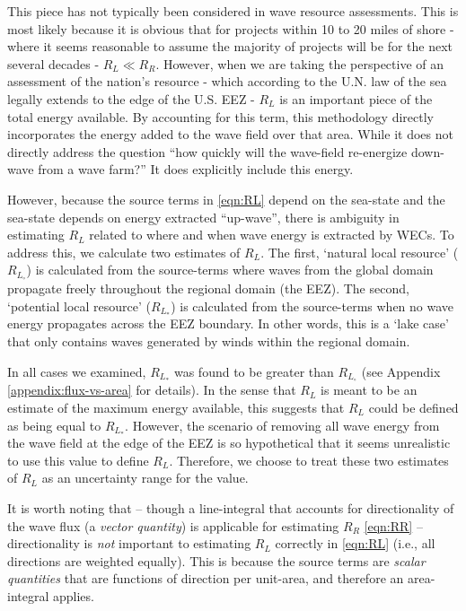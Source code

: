 This piece has not typically been considered in wave resource assessments. This is most likely because it is obvious that for projects within 10 to 20 miles of shore - where it seems reasonable to assume the majority of projects will be for the next several decades - $R_L \ll R_R$. However, when we are taking the perspective of an assessment of the nation's resource - which according to the U.N. law of the sea legally extends to the edge of the U.S. EEZ - $R_L$ is an important piece of the total energy available. By accounting for this term, this methodology directly incorporates the energy added to the wave field over that area. While it does not directly address the question ``how quickly will the wave-field re-energize down-wave from a wave farm?'' It does explicitly include this energy. 

However, because the source terms in \eqref{eqn:RL} depend on the sea-state and the sea-state depends on energy extracted ``up-wave'', there is ambiguity in estimating $R_L$ related to where and when wave energy is extracted by WECs. To address this, we calculate two estimates of $R_L$. The first, `natural local resource' ($R_{L_\circ}$) is calculated from the source-terms where waves from the global domain propagate freely throughout the regional domain (the EEZ). The second, `potential local resource' ($R_{L_*}$) is calculated from the source-terms when no wave energy propagates across the EEZ boundary. In other words, this is a `lake case' that only contains waves generated by winds within the regional domain.

In all cases we examined, $R_{L_*}$ was found to be greater than $R_{L_\circ}$ (see Appendix \ref{appendix:flux-vs-area} for details). In the sense that $R_L$ is meant to be an estimate of the maximum energy available, this suggests that $R_L$ could be defined as being equal to $R_{L_*}$. However, the scenario of removing all wave energy from the wave field at the edge of the EEZ is so hypothetical that it seems unrealistic to use this value to define $R_L$. Therefore, we choose to treat these two estimates of $R_L$ as an uncertainty range for the value.

It is worth noting that -- though a line-integral that accounts for directionality of the wave flux (a {\em vector quantity}) is applicable for estimating $R_R$ \eqref{eqn:RR} -- directionality is {\em not } important to estimating $R_L$ correctly in \eqref{eqn:RL} (i.e., all directions are weighted equally). This is because the source terms are {\em scalar quantities} that are functions of direction per unit-area, and therefore an area-integral applies.


